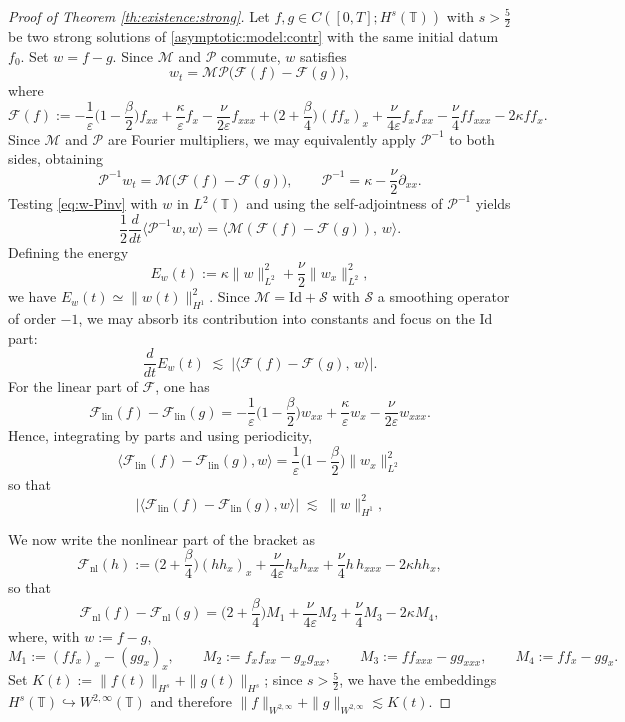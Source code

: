 \documentclass[reqno]{amsart}
\newcommand{\TT}{\mathbb T}
\newcommand{\Id}{\mathrm{Id}}
\theoremstyle{definition}
\numberwithin{equation}{section}
\numberwithin{theorem}{section}
\numberwithin{definition}{section}
\begin{document}
\begin{proof}[Proof of Theorem \ref{th:existence:strong}]
Let $f,g\in C([0,T];H^s(\TT))$ with $s>\frac52$ be two strong solutions of \eqref{asymptotic:model:contr}
with the same initial datum $f_0$. Set $w=f-g$. Since $\mathcal{M}$ and $\mathcal{P}$ commute, $w$ satisfies
\begin{equation}\label{eq:w-eq}
	w_t = \mathcal{M}\mathcal{P}\big(\mathcal{F}(f)-\mathcal{F}(g)\big),
\end{equation}
where
\[
\mathcal{F}(f):=
- \frac{1}{\varepsilon}\Big(1-\frac{\beta}{2}\Big) f_{xx}
+ \frac{\kappa}{\varepsilon} f_x
- \frac{\nu}{2\varepsilon} f_{xxx}
+ \Big(2+\frac{\beta}{4}\Big)(f f_x)_x
+ \frac{\nu}{4\varepsilon} f_x f_{xx}
- \frac{\nu}{4} f f_{xxx}
- 2\kappa f f_x.
\]
Since $\mathcal{M}$ and $\mathcal{P}$ are Fourier multipliers, we may equivalently apply $\mathcal{P}^{-1}$ to both sides,
obtaining
\begin{equation}\label{eq:w-Pinv}
	\mathcal{P}^{-1} w_t = \mathcal{M}\big(\mathcal{F}(f)-\mathcal{F}(g)\big),
	\qquad \mathcal{P}^{-1}=\kappa-\frac{\nu}{2}\partial_{xx}.
\end{equation}
Testing \eqref{eq:w-Pinv} with $w$ in $L^2(\TT)$ and using the self-adjointness of $\mathcal{P}^{-1}$ yields
\[
\frac12\frac{d}{dt}\langle \mathcal{P}^{-1}w,w\rangle
= \langle \mathcal{M}(\mathcal{F}(f)-\mathcal{F}(g)),\,w\rangle.
\]
Defining the energy
\[
E_{w}(t):=\kappa\|w\|_{L^2}^2+\frac{\nu}{2}\|w_x\|_{L^2}^2,
\]
we have $E_w(t)\simeq \|w(t)\|_{H^1}^2$. Since $\mathcal{M}=\Id+\mathcal{S}$ with $\mathcal{S}$ a smoothing operator of order $-1$,
we may absorb its contribution into constants and focus on the $\Id$ part:
\[
\frac{d}{dt}E_w(t)
\;\lesssim\;
\big|\langle \mathcal{F}(f)-\mathcal{F}(g),\,w\rangle\big|.
\]
For the linear part of $\mathcal{F}$, one has
\[
\mathcal{F}_{\mathrm{lin}}(f)-\mathcal{F}_{\mathrm{lin}}(g)
= -\frac{1}{\varepsilon}\Big(1-\frac{\beta}{2}\Big)w_{xx}
+\frac{\kappa}{\varepsilon}w_x
-\frac{\nu}{2\varepsilon}w_{xxx}.
\]
Hence, integrating by parts and using periodicity,
\[
\langle \mathcal{F}_{\mathrm{lin}}(f)-\mathcal{F}_{\mathrm{lin}}(g),w\rangle
= \frac{1}{\varepsilon}\Big(1-\frac{\beta}{2}\Big)\|w_x\|_{L^2}^2
\]
so that
\[
\big|\langle \mathcal{F}_{\mathrm{lin}}(f)-\mathcal{F}_{\mathrm{lin}}(g),w\rangle\big|
\;\lesssim\;
\|w\|_{H^1}^2,
\]

We now write the nonlinear part of the bracket as
\[
\mathcal{F}_{\mathrm{nl}}(h)
:=\Big(2+\frac{\beta}{4}\Big)(h h_x)_x
+\frac{\nu}{4\varepsilon}h_x h_{xx}
+\frac{\nu}{4}h\,h_{xxx}
-2\kappa h h_x ,
\]
so that
\[
\mathcal{F}_{\mathrm{nl}}(f)-\mathcal{F}_{\mathrm{nl}}(g)
=\Big(2+\frac{\beta}{4}\Big)M_1+\frac{\nu}{4\varepsilon}M_2+\frac{\nu}{4}M_3-2\kappa M_4,
\]
where, with $w:=f-g$,
\[
M_1:=(f f_x)_x-(g g_x)_x,\qquad
M_2:=f_x f_{xx}-g_x g_{xx},\qquad
M_3:=f f_{xxx}-g g_{xxx},\qquad
M_4:=f f_x-g g_x.
\]
Set $K(t):=\|f(t)\|_{H^s}+\|g(t)\|_{H^s}$; since $s>\frac52$, we have the embeddings
$H^s(\TT)\hookrightarrow W^{2,\infty}(\TT)$ and therefore $\|f\|_{W^{2,\infty}}+\|g\|_{W^{2,\infty}}\lesssim K(t)$.


\end{proof}
\end{document}

